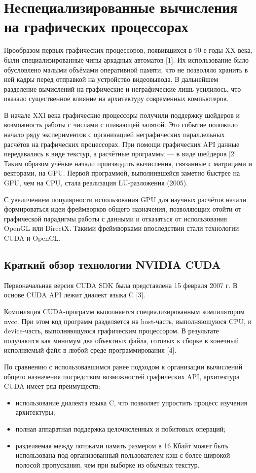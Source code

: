 \section{Неспециализированные вычисления на графических процессорах}

Прообразом первых графических процессоров, появившихся в 90-е годы XX века, были специализированные чипы аркадных автоматов [1]. Их использование было обусловлено малыми объёмами оперативной памяти, что не позволяло хранить в ней кадры перед отправкой на устройство видеовывода. В дальнейшем разделение вычислений на графические и неграфические лишь усилилось, что оказало существенное влияние на архитектуру современных компьютеров.

В начале XXI века графические процессоры получили поддержку шейдеров и возможность работы с числами с плавающей запятой. Это событие положило начало ряду экспериментов с организацией неграфических параллельных расчётов на графических процессорах. При помощи графических API данные передавались в виде текстур, а расчётные программы --- в виде шейдеров [2]. Таким образом учёные начали производить вычисления, связанные с матрицами и векторами, на GPU. Первой программой, выполнившейся заметно быстрее на GPU, чем на CPU, стала реализация LU-разложения (2005).

С увеличением популярности использования GPU для научных расчётов начали формироваться идеи фреймворков общего назначения, позволяющих отойти от графической парадигмы работы с данными и отказаться от использования OpenGL или DirectX. Такими фреймворками впоследствии стали технологии  CUDA и OpenCL.

\subsection{Краткий обзор технологии NVIDIA CUDA}

Первоначальная версия CUDA SDK была представлена 15 февраля 2007 г. В основе CUDA API лежит диалект языка C [3].

Компиляция CUDA-программ выполняется специализированным компилятором nvcc. При этом код программ разделяется на host-часть, выполняющуюся CPU, и device-часть, выполняющуюся графическим процессором. В результате получаются как минимум два объектных файла, готовых к сборке в конечный исполняемый файл в любой среде программирования [4].

По сравнению с использовавшимся ранее подходом к организации вычислений общего назначения посредством возможностей графических API, архитектура CUDA имеет ряд преимуществ:
\begin{itemize}
\item использование диалекта языка C, что позволяет упростить процесс изучения архитектуры;
\item полная аппаратная поддержка целочисленных и побитовых операций;
\item разделяемая между потоками память размером в 16 Кбайт может быть использована под организованный пользователем кэш с более широкой полосой пропускания, чем при выборке из обычных текстур.
\end{itemize}

